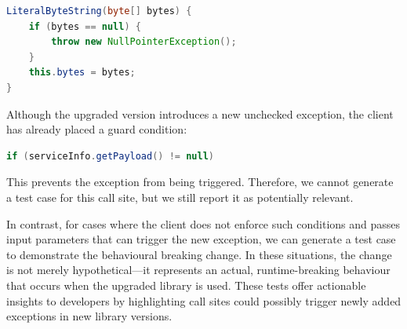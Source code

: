 \begin{lstlisting}[language=Java, basicstyle=\scriptsize\ttfamily]
LiteralByteString(byte[] bytes) {
    if (bytes == null) {
        throw new NullPointerException();
    }
    this.bytes = bytes;
}
\end{lstlisting}

Although the upgraded version introduces a new unchecked exception, the client has already placed a guard condition:

\begin{lstlisting}[language=Java, basicstyle=\scriptsize\ttfamily]
if (serviceInfo.getPayload() != null)
\end{lstlisting}

This prevents the exception from being triggered. Therefore, we cannot generate a test case for this call site, but we still report it as potentially relevant.

In contrast, for cases where the client does not enforce such conditions and passes input parameters that can trigger the new exception, we can generate a test case to demonstrate the behavioural breaking change. In these situations, the change is not merely hypothetical—it represents an actual, runtime-breaking behaviour that occurs when the upgraded library is used. These tests offer actionable insights to developers by highlighting call sites could possibly trigger newly added exceptions in new library versions.


